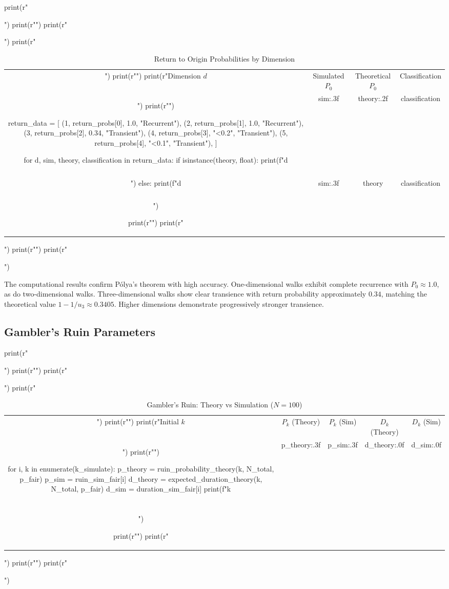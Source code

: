 \documentclass[a4paper, 11pt]{article}
\begin{document}
\begin{pycode}
print(r"\begin{table}[htbp]")
print(r"\centering")
print(r"\caption{Return to Origin Probabilities by Dimension}")
print(r"\begin{tabular}{cccc}")
print(r"\toprule")
print(r"Dimension $d$ & Simulated $P_0$ & Theoretical $P_0$ & Classification \\")
print(r"\midrule")

return_data = [
    (1, return_probs[0], 1.0, "Recurrent"),
    (2, return_probs[1], 1.0, "Recurrent"),
    (3, return_probs[2], 0.34, "Transient"),
    (4, return_probs[3], "<0.2", "Transient"),
    (5, return_probs[4], "<0.1", "Transient"),
]

for d, sim, theory, classification in return_data:
    if isinstance(theory, float):
        print(f"{d} & {sim:.3f} & {theory:.2f} & {classification} \\\\")
    else:
        print(f"{d} & {sim:.3f} & {theory} & {classification} \\\\")

print(r"\bottomrule")
print(r"\end{tabular}")
print(r"\label{tab:dimensions}")
print(r"\end{table}")
\end{pycode}

The computational results confirm P\'olya's theorem with high accuracy. One-dimensional walks
exhibit complete recurrence with $P_0 \approx 1.0$, as do two-dimensional walks. Three-dimensional
walks show clear transience with return probability approximately $0.34$, matching the theoretical
value $1 - 1/u_3 \approx 0.3405$. Higher dimensions demonstrate progressively stronger transience.

\subsection{Gambler's Ruin Parameters}

\begin{pycode}
print(r"\begin{table}[htbp]")
print(r"\centering")
print(r"\caption{Gambler's Ruin: Theory vs Simulation ($N=100$)}")
print(r"\begin{tabular}{ccccc}")
print(r"\toprule")
print(r"Initial $k$ & $P_k$ (Theory) & $P_k$ (Sim) & $D_k$ (Theory) & $D_k$ (Sim) \\")
print(r"\midrule")

for i, k in enumerate(k_simulate):
    p_theory = ruin_probability_theory(k, N_total, p_fair)
    p_sim = ruin_sim_fair[i]
    d_theory = expected_duration_theory(k, N_total, p_fair)
    d_sim = duration_sim_fair[i]
    print(f"{k} & {p_theory:.3f} & {p_sim:.3f} & {d_theory:.0f} & {d_sim:.0f} \\\\")

print(r"\bottomrule")
print(r"\end{tabular}")
print(r"\label{tab:ruin}")
print(r"\end{table}")
\end{pycode}
\end{document}
